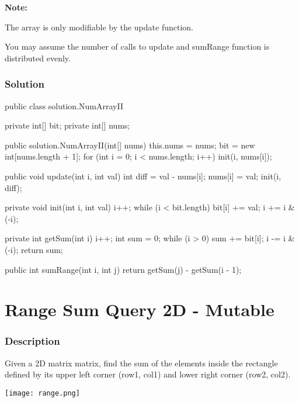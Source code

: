 \textbf{Note:}

The array is only modifiable by the update function.

You may assume the number of calls to update and sumRange function is distributed evenly.

\subsubsection{Solution}

\begin{Code}
public class solution.NumArrayII {
    private int[] bit;
    private int[] nums;

    public solution.NumArrayII(int[] nums) {
        this.nums = nums;
        bit = new int[nums.length + 1];
        for (int i = 0; i < nums.length; i++) {
            init(i, nums[i]);
        }
    }

    public void update(int i, int val) {
        int diff = val - nums[i];
        nums[i] = val;
        init(i, diff);
    }

    private void init(int i, int val) {
        i++;
        while (i < bit.length) {
            bit[i] += val;
            i += i & (-i);
        }
    }

    private int getSum(int i) {
        i++;
        int sum = 0;
        while (i > 0) {
            sum += bit[i];
            i -= i & (-i);
        }
        return sum;
    }

    public int sumRange(int i, int j) {
        return getSum(j) - getSum(i - 1);
    }
}
\end{Code}

\newpage

\section{Range Sum Query 2D - Mutable} %

\subsubsection{Description}
Given a 2D matrix matrix, find the sum of the elements inside the rectangle defined by its upper left corner (row1, col1) and lower right corner (row2, col2).

\begin{center}
\texttt{[image: range.png]}\\
\end{center}

